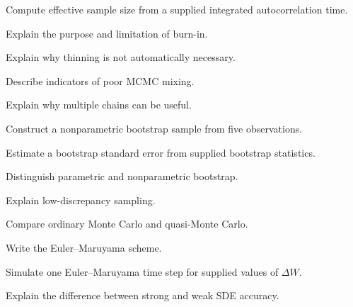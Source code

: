 \begin{exercise}[3]
Compute effective sample size from a supplied integrated autocorrelation
time.
\end{exercise}

\begin{exercise}[3]
Explain the purpose and limitation of burn-in.
\end{exercise}

\begin{exercise}[3]
Explain why thinning is not automatically necessary.
\end{exercise}

\begin{exercise}[3]
Describe indicators of poor MCMC mixing.
\end{exercise}

\begin{exercise}[3]
Explain why multiple chains can be useful.
\end{exercise}

\begin{exercise}[3]
Construct a nonparametric bootstrap sample from five observations.
\end{exercise}

\begin{exercise}[3]
Estimate a bootstrap standard error from supplied bootstrap statistics.
\end{exercise}

\begin{exercise}[3]
Distinguish parametric and nonparametric bootstrap.
\end{exercise}

\begin{exercise}[3]
Explain low-discrepancy sampling.
\end{exercise}

\begin{exercise}[3]
Compare ordinary Monte Carlo and quasi-Monte Carlo.
\end{exercise}

\begin{exercise}[3]
Write the Euler--Maruyama scheme.
\end{exercise}

\begin{exercise}[3]
Simulate one Euler--Maruyama time step for supplied values of
\(\Delta W\).
\end{exercise}

\begin{exercise}[3]
Explain the difference between strong and weak SDE accuracy.
\end{exercise}

